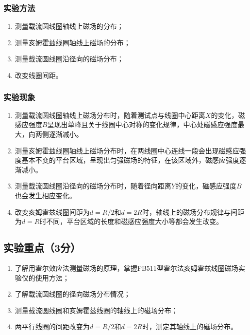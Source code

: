 \documentclass[]{../../templates/Report}%
\begin{document}
\subsubsection{实验方法}
\begin{enumerate}
    \item 测量载流圆线圈轴线上磁场的分布；
    \item 测量亥姆霍兹线圈轴线上磁场的分布；
    \item 测量载流圆线圈沿径向的磁场分布；
    \item 改变线圈间距。
\end{enumerate}
\subsubsection{实验现象}
\begin{enumerate}
    \item 测量载流圆线圈轴线上磁场分布时，随着测试点与线圈中心距离$X$的变化，磁感应强度$B$呈现出单峰且关于线圈中心对称的变化规律，中心处磁感应强度最大，向两侧逐渐减小。
    \item 测量亥姆霍兹线圈轴线上磁场分布时，在两线圈中心连线一段会出现磁感应强度基本不变的平台区域，呈现出匀强磁场的特征，在该区域外，磁感应强度逐渐减小。
    \item 测量载流圆线圈沿径向的磁场分布时，随着径向距离$Y$的变化，磁感应强度$B$也会发生相应变化。
    \item 改变亥姆霍兹线圈间距为\(d = R/2\)和\(d = 2R\)时，轴线上的磁场分布规律与间距为\(d = R\)时不同，平台区域的长度和磁感应强度大小等都会发生改变。
\end{enumerate}

\subsection{实验重点（3分）}
\begin{enumerate}
    \item 了解用霍尔效应法测量磁场的原理，掌握FB511型霍尔法亥姆霍兹线圈磁场实验仪的使用方法；
    \item 了解载流圆线圈的径向磁场分布情况；
    \item 测量载流圆线圈和亥姆霍兹线圈的轴线上的磁场分布；
    \item 两平行线圈的间距改变为\(d = R / 2\)和\(d = 2R\)时，测定其轴线上的磁场分布。
\end{enumerate}
\end{document}
